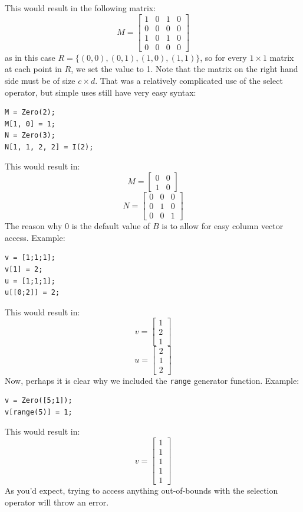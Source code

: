 This would result in the following matrix:
$$M = \begin{bmatrix}
1 & 0 & 1 & 0\\
0 & 0 & 0 & 0\\
1 & 0 & 1 & 0\\
0 & 0 & 0 & 0
\end{bmatrix}$$
as in this case $R=\{(0,0), (0,1), (1,0), (1,1)\}$, so for every $1\times 1$ matrix at each point in $R$, we set the value to 1.  Note that the matrix on the right hand side must be of size $c\times d$.  That was a relatively complicated use of the select operator, but simple uses still have very easy syntax:
\begin{lstlisting}
M = Zero(2);
M[1, 0] = 1;
N = Zero(3);
N[1, 1, 2, 2] = I(2);
\end{lstlisting}
This would result in:
$$M=\begin{bmatrix}0 & 0 \\ 1 & 0\end{bmatrix}$$
$$N=\begin{bmatrix}
0 & 0 & 0\\
0 & 1 & 0\\
0 & 0 & 1\end{bmatrix}$$
The reason why 0 is the default value of $B$ is to allow for easy column vector access.  Example:
\begin{lstlisting}
v = [1;1;1];
v[1] = 2;
u = [1;1;1];
u[[0;2]] = 2;
\end{lstlisting}
This would result in:
$$v=\begin{bmatrix}1\\2\\1\end{bmatrix}$$
$$u=\begin{bmatrix}2\\1\\2\end{bmatrix}$$
Now, perhaps it is clear why we included the \verb=range= generator function.  Example:
\begin{lstlisting}
v = Zero([5;1]);
v[range(5)] = 1;
\end{lstlisting}
This would result in:
$$v=\begin{bmatrix}1\\1\\1\\1\\1\end{bmatrix}$$
As you'd expect, trying to access anything out-of-bounds with the selection operator will throw an error.

